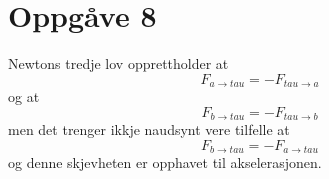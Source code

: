 \documentclass[12pt,a4paper]{article}
\begin{document}
  \section*{Oppgåve 8}
    Newtons tredje lov opprettholder at 
    \begin{equation}
      F_{a \rightarrow tau} = -F_{tau \rightarrow a}
    \end{equation}
    og at
    \begin{equation}
      F_{b \rightarrow tau} = -F_{tau \rightarrow b}
    \end{equation}
    men det trenger ikkje naudsynt vere tilfelle at
    \begin{equation}
      F_{b \rightarrow tau} = -F_{a \rightarrow tau}
    \end{equation}
    og denne skjevheten er opphavet til akselerasjonen.
\end{document}
